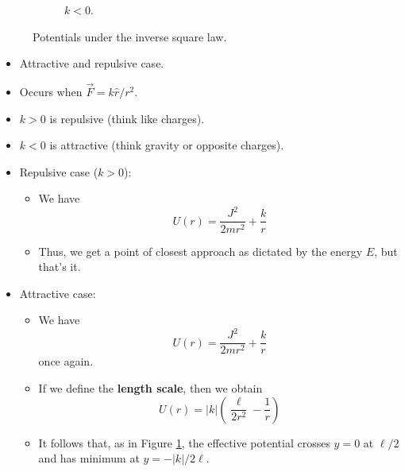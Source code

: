 \documentclass[../notes.tex]{subfiles}
\begin{document}
\begin{itemize}
\begin{figure}[h!]
\begin{subfigure}[b]{0.3\linewidth}
            \caption{$k<0$.}
            \label{fig:invSqPotb}
        \end{subfigure}
        \caption{Potentials under the inverse square law.}
        \label{fig:invSqPot}
    \end{figure}
    \begin{itemize}
        \item Attractive and repulsive case.
        \item Occurs when $\vec{F}=k\hat{r}/r^2$.
        \item $k>0$ is repulsive (think like charges).
        \item $k<0$ is attractive (think gravity or opposite charges).
        \item Repulsive case ($k>0$):
        \begin{itemize}
            \item We have
            \begin{equation*}
                U(r) = \frac{J^2}{2mr^2}+\frac{k}{r}
            \end{equation*}
            \item Thus, we get a point of closest approach as dictated by the energy $E$, but that's it.
        \end{itemize}
        \item Attractive case:
        \begin{itemize}
            \item We have
            \begin{equation*}
                U(r) = \frac{J^2}{2mr^2}+\frac{k}{r}
            \end{equation*}
            once again.
            \item If we define the \textbf{length scale}, then we obtain
            \begin{equation*}
                U(r) = |k|\left( \frac{\ell}{2r^2}-\frac{1}{r} \right)
            \end{equation*}
            \item It follows that, as in Figure \ref{fig:invSqPotb}, the effective potential crosses $y=0$ at $\ell/2$ and has minimum at $y=-|k|/2\ell$.

\end{itemize}
\end{itemize}
\end{itemize}
\end{document}
